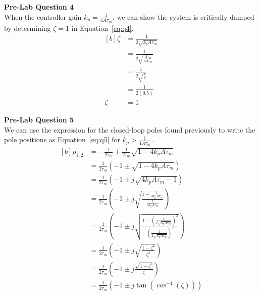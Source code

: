 \documentclass[12pt]{article}
\begin{document}
\textbf{Pre-Lab Question 4} \\
When the controller gain $k_p = \frac{1}{4A\tau_m}$, we can show the system is critically damped by determining $\zeta = 1$ in Equation~\ref{eq:q4}.
\begin{equation} \label{eq:q4}
\begin{aligned}[b]
    \zeta &= \frac{1}{2\sqrt{k_pA\tau_m}} \\
    &= \frac{1}{2\sqrt{\frac{A\tau_m}{4A\tau_m}}} \\
    &= \frac{1}{2\sqrt{\frac{1}{4}}} \\
    &= \frac{1}{2(0.5)} \\
    \zeta &= 1
\end{aligned}
\end{equation}

\textbf{Pre-Lab Question 5} \\
We can use the expression for the closed-loop poles found previously to write the pole positions as Equation~\ref{eq:q5} for $k_p > \frac{1}{4A\tau_m}$. 
\begin{equation} \label{eq:q5}
\begin{aligned}[b]
    p_{1,2} &= -\frac{1}{2\tau_m} \pm \frac{1}{2\tau_m}\sqrt{1 - 4k_p A \tau_m} \\
    &= \frac{1}{2\tau_m} \left( -1 \pm \sqrt{1 - 4k_p A \tau_m} \right) \\
    &= \frac{1}{2\tau_m} \left( -1 \pm j\sqrt{4k_p A \tau_m - 1} \right) \\
    &= \frac{1}{2\tau_m} \left( -1 \pm j\sqrt{\frac{1 - \frac{1}{4k_pA\tau_m}}{\frac{1}{4k_pA\tau_m}}} \right) \\
    &= \frac{1}{2\tau_m} \left( -1 \pm j\sqrt{\frac{1 - \left(\frac{1}{2\sqrt{k_pA\tau_m}}\right)^2}{\left(\frac{1}{2\sqrt{k_pA\tau_m}}\right)^2}} \right) \\
    &= \frac{1}{2\tau_m} \left( -1 \pm j\sqrt{\frac{1 - \zeta^2}{\zeta^2}} \right) \\
    &= \frac{1}{2\tau_m} \left( -1 \pm j{\frac{\sqrt{1 - \zeta^2}}{\zeta}} \right) \\
    &= \frac{1}{2\tau_m} \left( -1 \pm j\tan(\cos^{-1}(\zeta))\right) \\ %
\end{aligned}
\end{equation}
\end{document}
